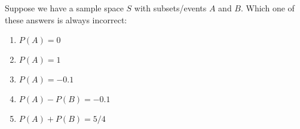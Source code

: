 \documentclass[poll_tutorial_format]{subfiles}
\begin{document}
	\begin{exercise}
		Suppose we have a sample space $S$ with subsets/events $A$ and $B$.
			Which one of these answers is always incorrect:
		\begin{enumerate}
			\item $P(A)=0$
			\item $P(A)=1$
			\item $P(A)=-0.1$
			\item $P(A)-P(B)=-0.1$
			\item $P(A)+P(B)=5/4$
		\end{enumerate}
	\end{exercise}
	 
  
 
 
\end{document}
